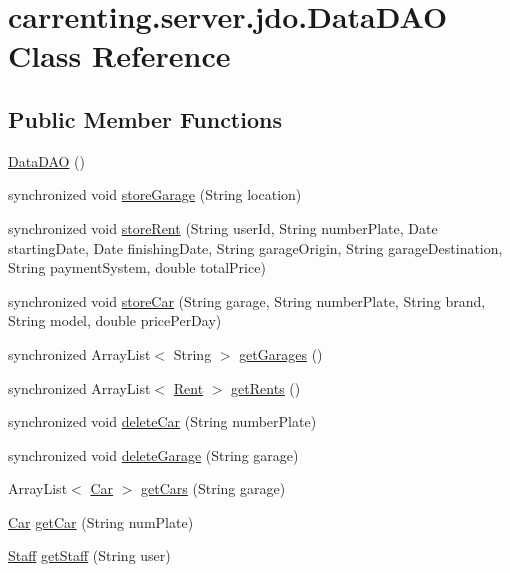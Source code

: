 \hypertarget{classcarrenting_1_1server_1_1jdo_1_1_data_d_a_o}{}\section{carrenting.\+server.\+jdo.\+Data\+D\+AO Class Reference}
\label{classcarrenting_1_1server_1_1jdo_1_1_data_d_a_o}
\subsection*{Public Member Functions}
\begin{DoxyCompactItemize}
\item 
\mbox{\hyperlink{classcarrenting_1_1server_1_1jdo_1_1_data_d_a_o_a99112c37c44213ed0f42c0a888c28efc}{Data\+D\+AO}} ()
\item 
synchronized void \mbox{\hyperlink{classcarrenting_1_1server_1_1jdo_1_1_data_d_a_o_acc6c38b4b5481d4e22f7673fed01c25c}{store\+Garage}} (String location)
\item 
synchronized void \mbox{\hyperlink{classcarrenting_1_1server_1_1jdo_1_1_data_d_a_o_acf4c9d1e243934c4e900c5f78276d781}{store\+Rent}} (String user\+Id, String number\+Plate, Date starting\+Date, Date finishing\+Date, String garage\+Origin, String garage\+Destination, String payment\+System, double total\+Price)
\item 
synchronized void \mbox{\hyperlink{classcarrenting_1_1server_1_1jdo_1_1_data_d_a_o_af9e2798cf3b06a1fbcb74f3bc92c670f}{store\+Car}} (String garage, String number\+Plate, String brand, String model, double price\+Per\+Day)
\item 
synchronized Array\+List$<$ String $>$ \mbox{\hyperlink{classcarrenting_1_1server_1_1jdo_1_1_data_d_a_o_a5b1d1d55affddcf556ee7e0f8fae8396}{get\+Garages}} ()
\item 
synchronized Array\+List$<$ \mbox{\hyperlink{classcarrenting_1_1server_1_1jdo_1_1_rent}{Rent}} $>$ \mbox{\hyperlink{classcarrenting_1_1server_1_1jdo_1_1_data_d_a_o_a5c545569e40ce40b601fe18964801238}{get\+Rents}} ()
\item 
synchronized void \mbox{\hyperlink{classcarrenting_1_1server_1_1jdo_1_1_data_d_a_o_ac28ce30e234f307f395f5a21e3aab17b}{delete\+Car}} (String number\+Plate)
\item 
synchronized void \mbox{\hyperlink{classcarrenting_1_1server_1_1jdo_1_1_data_d_a_o_ad1ff1ec34fc9fd66558f52c493bf8afd}{delete\+Garage}} (String garage)
\item 
Array\+List$<$ \mbox{\hyperlink{classcarrenting_1_1server_1_1jdo_1_1_car}{Car}} $>$ \mbox{\hyperlink{classcarrenting_1_1server_1_1jdo_1_1_data_d_a_o_adf525acd8c1b628a4f828d15b16d6730}{get\+Cars}} (String garage)
\item 
\mbox{\hyperlink{classcarrenting_1_1server_1_1jdo_1_1_car}{Car}} \mbox{\hyperlink{classcarrenting_1_1server_1_1jdo_1_1_data_d_a_o_a77ba4c9c8444bfeb2523ca327041dfbe}{get\+Car}} (String num\+Plate)
\item 
\mbox{\hyperlink{classcarrenting_1_1server_1_1jdo_1_1_staff}{Staff}} \mbox{\hyperlink{classcarrenting_1_1server_1_1jdo_1_1_data_d_a_o_a4c1e6e490bab3a0bbd0c1159ef856800}{get\+Staff}} (String user)
\end{DoxyCompactItemize}
